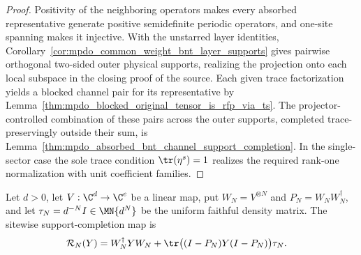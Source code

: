 \begin{proof}\leanok
    Positivity of the neighboring operators makes every absorbed
    representative generate positive semidefinite periodic operators, and
    one-site spanning makes it injective. With the unstarred layer
    identities, Corollary~\ref{cor:mpdo_common_weight_bnt_layer_supports}
    gives pairwise orthogonal two-sided outer physical supports, realizing
    the projection onto each local subspace in the closing proof of the
    source. Each given trace factorization yields a blocked channel pair
    for its representative by
    Lemma~\ref{thm:mpdo_blocked_original_tensor_is_rfp_via_ts}. The
    projector-controlled combination of these pairs across the outer
    supports, completed trace-preservingly outside their sum, is
    Lemma~\ref{thm:mpdo_absorbed_bnt_channel_support_completion}. In the
    single-sector case the sole trace condition $\tr(\eta^s)=1$ realizes the
    required rank-one normalization with unit coefficient families.
\end{proof}

\begin{definition}
    \label{def:mpdo_sitewise_physical_recovery}
    \leanok
    Let $d>0$, let $V:\C^d\to\C^e$ be a linear map, put
    $W_N=V^{\otimes N}$ and $P_N=W_NW_N^\dagger$, and let
    $\tau_N=d^{-N}I\in\MN{d^N}$ be the uniform faithful density matrix. The
    sitewise support-completion map is
    \begin{align}
        \mathcal R_N(Y)
         & =W_N^\dagger YW_N
        +\tr\bigl((I-P_N)Y(I-P_N)\bigr)\tau_N.
        \label{eq:mpdo_sitewise_physical_recovery}
    \end{align}
\end{definition}

